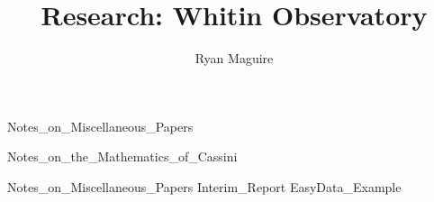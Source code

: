\documentclass[crop=false,class=book,oneside]{standalone}
\begin{document}
    \newif\ifresearchwhitinobservatory
    \ifx\ifcourses\undefined
        \title{Research: Whitin Observatory}
        \author{Ryan Maguire}
        \date{\vspace{-5ex}}
        \maketitle
        \tableofcontents
        \listoffigures
        \listoftables
        \clearpage
    \fi
    
              {Notes_on_Miscellaneous_Papers}
    
              {Notes_on_the_Mathematics_of_Cassini}
    
              {Notes_on_Miscellaneous_Papers}
    {Interim_Report}
    {EasyData_Example}
\end{document}
